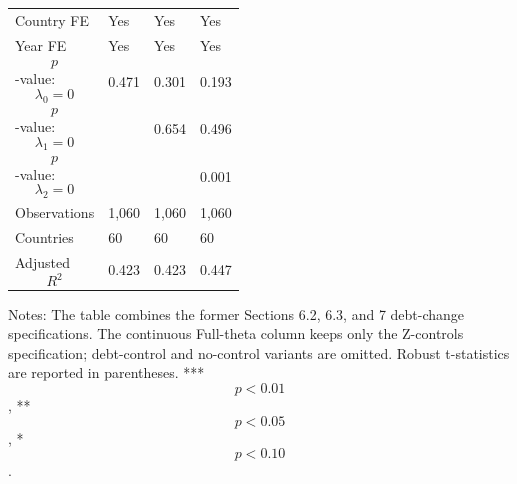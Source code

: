 \begin{table}[H]
\begin{threeparttable}
\begin{tabularx}{\textwidth}{lYYY}
Country FE & Yes & Yes & Yes \\
Year FE & Yes & Yes & Yes \\
$$p$$-value: $$\lambda_0=0$$ & 0.471 & 0.301 & 0.193 \\
$$p$$-value: $$\lambda_1=0$$ &  & 0.654 & 0.496 \\
$$p$$-value: $$\lambda_2=0$$ &  &  & 0.001 \\
Observations & 1,060 & 1,060 & 1,060 \\
Countries & 60 & 60 & 60 \\
Adjusted $$R^2$$ & 0.423 & 0.423 & 0.447 \\
\bottomrule
\end{tabularx}
\begin{tablenotes}[flushleft]\footnotesize
\item Notes: The table combines the former Sections 6.2, 6.3, and 7 debt-change specifications. The continuous Full-theta column keeps only the Z-controls specification; debt-control and no-control variants are omitted. Robust t-statistics are reported in parentheses. *** $$p<0.01$$, ** $$p<0.05$$, * $$p<0.10$$.
\end{tablenotes}
\end{threeparttable}
\end{table}
